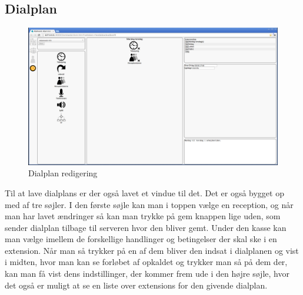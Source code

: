 \subsection{Dialplan}
\begin{figure}[ht!]
\centering
\includegraphics[width=\textwidth]{images/screen_dialplan.png}
\caption{Dialplan redigering}
\label{fig:screendialplan}
\end{figure}
Til at lave dialplans er der også lavet et vindue til det. Det er også bygget op med af tre søjler. I den første søjle kan man i toppen vælge en reception, og når man har lavet ændringer så kan man trykke på gem knappen lige uden, som sender dialplan tilbage til serveren hvor den bliver gemt. Under den kasse kan man vælge imellem de forskellige handlinger og betingelser der skal ske i en extension. Når man så trykker på en af dem bliver den indsat i dialplanen og vist i midten, hvor man kan se forløbet af opkaldet og trykker man så på dem der, kan man få vist dens indstillinger, der kommer frem ude i den højre søjle, hvor det også er muligt at se en liste over extensions for den givende dialplan.


%    
%
%

